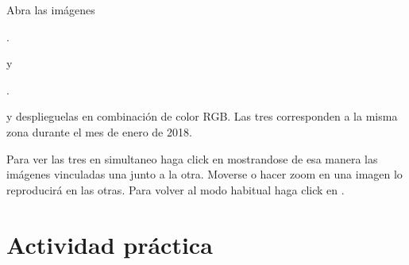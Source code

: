 Abra las imágenes
\begin{center} .
\end{center}
y
\begin{center} .
\end{center}

y desplieguelas en combinación de color RGB. Las tres corresponden a la misma zona durante el mes de enero de 2018.

Para ver las tres en simultaneo haga click en  mostrandose de esa manera las imágenes vinculadas una junto a la otra. Moverse o hacer zoom en una imagen lo reproducirá en las otras. Para volver al modo habitual haga click en .

\section{Actividad práctica}

